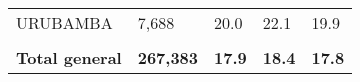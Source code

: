 \begin{tabular}{lllll}
	\cellcolor[HTML]{FF5050}URUBAMBA                               & 7,688                                                                 & 20.0                                                                             & 22.1                                                                        & 19.9                                                                                \\
	&                                                                       &                                                                                  &                                                                             &                                                                                     \\
	\rowcolor[HTML]{DDEBF7} 
	\textbf{Total   general}                                       & \textbf{267,383}                                                      & \textbf{17.9}                                                                    & \textbf{18.4}                                                               & \textbf{17.8}                                                                      
\end{tabular}